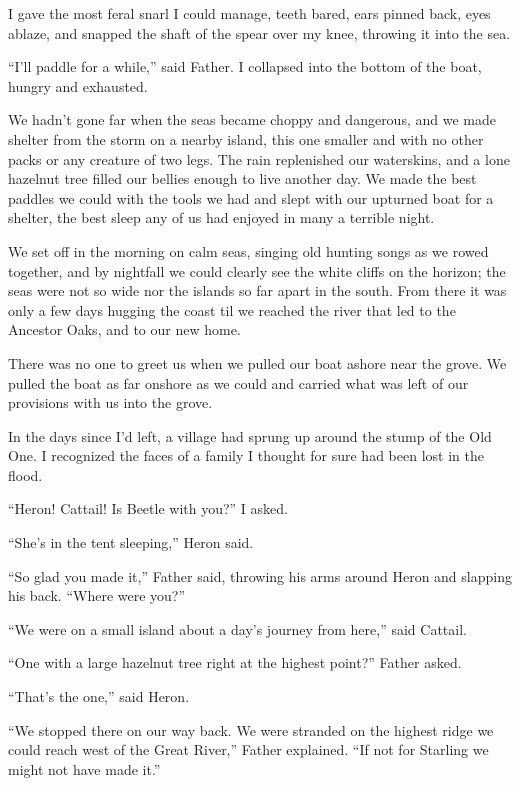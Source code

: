 I gave the most feral snarl I could manage, teeth bared, ears pinned back, eyes ablaze, and snapped the shaft of the spear over my knee, throwing it into the sea.

``I'll paddle for a while,'' said Father. I collapsed into the bottom of the boat, hungry and exhausted.

\secdiv

\noindent We hadn't gone far when the seas became choppy and dangerous, and we made shelter from the storm on a nearby island, this one smaller and with no other packs or any creature of two legs. The rain replenished our waterskins, and a lone hazelnut tree filled our bellies enough to live another day. We made the best paddles we could with the tools we had and slept with our upturned boat for a shelter, the best sleep any of us had enjoyed in many a terrible night.

We set off in the morning on calm seas, singing old hunting songs as we rowed together, and by nightfall we could clearly see the white cliffs on the horizon; the seas were not so wide nor the islands so far apart in the south. From there it was only a few days hugging the coast til we reached the river that led to the Ancestor Oaks, and to our new home.

There was no one to greet us when we pulled our boat ashore near the grove. We pulled the boat as far onshore as we could and carried what was left of our provisions with us into the grove.

In the days since I'd left, a village had sprung up around the stump of the Old One. I recognized the faces of a family I thought for sure had been lost in the flood.

``Heron! Cattail! Is Beetle with you?'' I asked.

``She's in the tent sleeping,'' Heron said.

``So glad you made it,'' Father said, throwing his arms around Heron and slapping his back. ``Where were you?''

``We were on a small island about a day's journey from here,'' said Cattail.

``One with a large hazelnut tree right at the highest point?'' Father asked.

``That's the one,'' said Heron.

``We stopped there on our way back. We were stranded on the highest ridge we could reach west of the Great River,'' Father explained. ``If not for Starling we might not have made it.''

